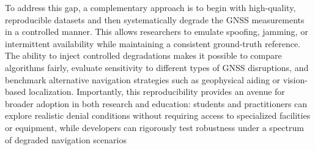 \documentclass[Afour,sageh,times]{sagej}
\begin{document}
To address this gap, a complementary approach is to begin with high-quality, reproducible datasets and then systematically degrade the GNSS measurements in a controlled manner. This allows researchers to emulate spoofing, jamming, or intermittent availability while maintaining a consistent ground-truth reference. The ability to inject controlled degradations makes it possible to compare algorithms fairly, evaluate sensitivity to different types of GNSS disruptions, and benchmark alternative navigation strategies such as geophysical aiding or vision-based localization. Importantly, this reproducibility provides an avenue for broader adoption in both research and education: students and practitioners can explore realistic denial conditions without requiring access to specialized facilities or equipment, while developers can rigorously test robustness under a spectrum of degraded navigation scenarios


\end{document}

